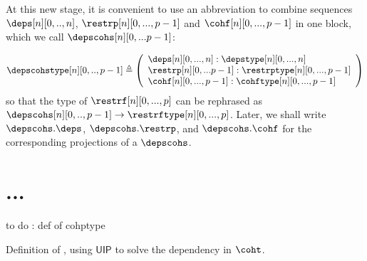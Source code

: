 \documentclass{msc}
\newcommand{\defeq}{\ensuremath{\triangleq}}
\newcommand{\UIP}{\textsf{UIP}}
\begin{document}
At this new stage, it is convenient to use an abbreviation to combine sequences $\deps[n][0,..,n]$, $\restrp[n][0,...,p-1]$ and $\cohf[n][0,...,p-1]$ in one block, which we call $\depscohs[n][0,...p-1]$:

\begin{align*}
  \depscohstype[n][0,..,p-1] \defeq
  \left(\begin{array}{l}
            \deps[n][0,...,n] :\depstype[n][0,...,n]        \\
            \restrp[n][0,...p-1]: \restrptype[n][0,...,p-1] \\
            \cohf[n][0,...,p-1]: \cohftype[n][0,...,p-1]    \\
          \end{array}\right)
\end{align*}
so that the type of $\restrf[n][0,...,p]$ can be rephrased as $\depscohs[n][0,..,p-1] \rightarrow \restrftype[n][0,...,p]$. Later, we shall write $\depscohs.\deps$, $\depscohs.\restrp$, and $\depscohs.\cohf$ for the corresponding projections of a $\depscohs$.

\section{...}

to do : def of cohptype

Definition of \cohf, using $\UIP$ to solve the dependency in $\coht$.
\end{document}
